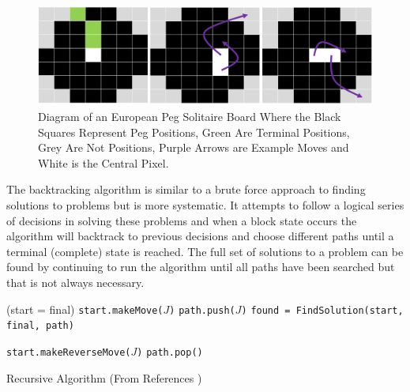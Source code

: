\documentclass[a4paper]{article}
\begin{document}
\begin{figure}[H]
	\centering
	\label{board}
	\includegraphics[width=.95\textwidth,scale=.95]{images/board}
	\caption{Diagram of an European Peg Solitaire Board Where the
				Black Squares Represent Peg Positions,
				Green Are Terminal Positions,
				Grey Are Not Positions,
				Purple Arrows are Example Moves and
				White is the Central Pixel.
			}
\end{figure}

\noindent The backtracking algorithm is similar to a brute force approach to finding solutions to problems but is more systematic. It attempts to follow a logical series of decisions in solving these problems and when a block state occurs the algorithm will backtrack to previous decisions and choose different paths until a terminal (complete) state is reached. The full set of solutions to a problem can be found by continuing to run the algorithm until all paths have been searched but that is not always necessary.

\begin{algorithm}[H]
	\begin{algorithmic}[1]
				\State \Return (start = final)
			\Else 
				\For{\texttt{each jump $J \in$ [0,n) x [0,m) x \{NORTH,EAST,SOUTH,WEST\}}}
			        	\State \texttt{start.makeMove($J$)}
			        	\State \texttt{path.push($J$)}
			        	\State \texttt{found = FindSolution(start, final, path)}

			        		\State {}
			        	\Else
			        		\State \texttt{start.makeReverseMove($J$)}
			        		\State \texttt{path.pop()}
			        	\EndIf
					\EndIf
		      	\EndFor
		      	\State {}
			\EndIf 
		\EndProcedure
	\end{algorithmic}
	\caption{Recursive Algorithm (From References \cite{lab5})}\label{euclid}
\end{algorithm}
\end{document}
